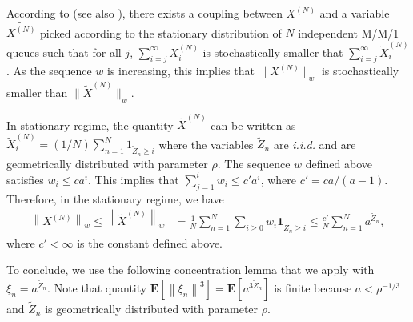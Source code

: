 \documentclass[sigconf]{acmart}
\newcommand\XN{X^{(N)}}
\newcommand\XtN{\tilde{X}^{(N)}}
\newcommand\esp[1]{\mathbf{E}\left[#1\right]}
\newcommand\sesp[1]{\mathbf{E}[#1]}
\newcommand\sProba[1]{\mathbf{P}[#1]}
\newcommand\norm[1]{\left\|#1\right\|}
\newcommand\snorm[1]{\|#1\|}
\begin{document}

According to \cite[Theorem~4]{turner1998effect} (see also
\cite[Theorem~4.1]{graham2000chaoticity}), there exists a coupling
between $\XN$ and a variable $\tilde{\XN}$ picked according to the
stationary distribution of $N$ independent M/M/1 queues such that for
all $j$, $\sum_{i=j}^\infty\XN_i$ is stochastically smaller that
$\sum_{i=j}^\infty\XtN_i$. As the sequence $w$ is increasing, this
implies that $\snorm{\XN}_w$ is stochastically smaller than
$\snorm{\XtN}_w$.

In stationary regime, the quantity $\XtN$ can be written as
$\XtN_i=(1/N)\sum_{n=1}^N1_{\tilde{Z}_n\ge i}$ where the variables
$\tilde{Z}_n$ are \emph{i.i.d.} and are geometrically distributed with
parameter $\rho$. The sequence $w$ defined above satisfies
$w_i\le c a^i$. This implies that $\sum_{j=1}^i w_i\le c' a^i$, where
$c'=ca/(a-1)$.  Therefore, in the stationary regime, we have
\begin{align*}
  \norm{\XN}_w\le\norm{\tilde \XN}_w&=\frac{1}{N}\sum_{n=1}^N\sum_{i\ge0} w_i
                                      \mathbf{1}_{\tilde{Z}_n\ge i} 
  \le \frac{c'}{N}\sum_{n=1}^Na^{\tilde{Z}_n},
\end{align*}
where $c'<\infty$ is the constant defined above.

To conclude, we use the following concentration lemma that we apply
with $\xi_n=a^{\tilde{Z}_n}$. Note that quantity
$\esp{\norm{\xi_n}^3}=\sesp{a^{3\tilde{Z}_n}}$ is finite because
$a<\rho^{-1/3}$ and $\tilde{Z}_n$ is geometrically distributed with
parameter $\rho$.
\end{document}

